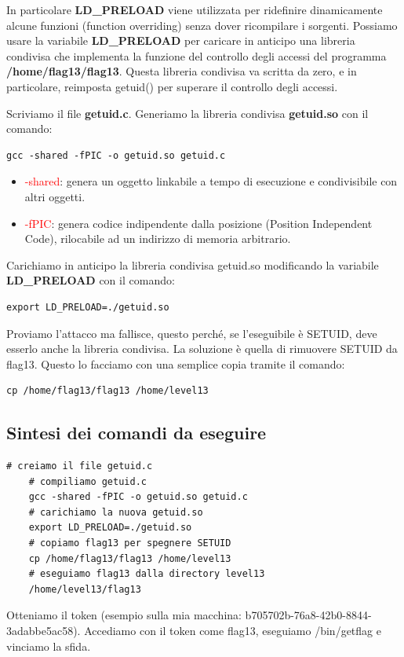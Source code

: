 In particolare \textbf{LD\_PRELOAD} viene utilizzata per ridefinire dinamicamente alcune funzioni (function overriding) senza dover ricompilare i sorgenti.
Possiamo usare la variabile \textbf{LD\_PRELOAD} per caricare in anticipo una libreria condivisa che implementa la funzione del controllo degli accessi del programma \textbf{/home/flag13/flag13}. Questa libreria condivisa va scritta da zero, e in particolare, reimposta getuid() per superare il controllo degli accessi.

Scriviamo il file \textbf{getuid.c}.
Generiamo la libreria condivisa \textbf{getuid.so} con il comando: 
\begin{lstlisting}[style=bashstyle]
    gcc -shared -fPIC -o getuid.so getuid.c
\end{lstlisting}

\begin{itemize}
    \item \textcolor{red}{-shared}: genera un oggetto linkabile a tempo di esecuzione e condivisibile con altri oggetti.
    \item \textcolor{red}{-fPIC}: genera codice indipendente dalla posizione (Position Independent Code), rilocabile ad un indirizzo di memoria arbitrario.
\end{itemize}

Carichiamo in anticipo la libreria condivisa getuid.so modificando la variabile \textbf{LD\_PRELOAD} con il comando:
\begin{lstlisting}[style=bashstyle]
    export LD_PRELOAD=./getuid.so
\end{lstlisting}
Proviamo l'attacco ma fallisce, questo perché, se l'eseguibile è SETUID, deve esserlo anche la libreria condivisa.
La soluzione è quella di rimuovere SETUID da flag13. Questo lo facciamo con una semplice copia tramite il comando:
\begin{lstlisting}[style=bashstyle]
    cp /home/flag13/flag13 /home/level13
\end{lstlisting} 

\subsection{Sintesi dei comandi da eseguire}
\begin{lstlisting}[style=bashstyle]
    # creiamo il file getuid.c
    # compiliamo getuid.c
    gcc -shared -fPIC -o getuid.so getuid.c
    # carichiamo la nuova getuid.so
    export LD_PRELOAD=./getuid.so
    # copiamo flag13 per spegnere SETUID
    cp /home/flag13/flag13 /home/level13
    # eseguiamo flag13 dalla directory level13
    /home/level13/flag13
\end{lstlisting} 
Otteniamo il token (esempio sulla mia macchina: b705702b-76a8-42b0-8844-3adabbe5ac58).
Accediamo con il token come flag13, eseguiamo /bin/getflag e vinciamo la sfida.

